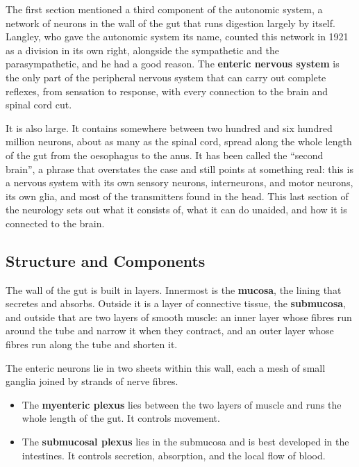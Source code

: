 \documentclass[11pt]{article}
\begin{document}
The first section mentioned a third component of the autonomic system, a network of neurons in the wall of the gut that runs digestion largely by itself. Langley, who gave the autonomic system its name, counted this network in 1921 as a division in its own right, alongside the sympathetic and the parasympathetic, and he had a good reason. The \textbf{enteric nervous system} is the only part of the peripheral nervous system that can carry out complete reflexes, from sensation to response, with every connection to the brain and spinal cord cut.

It is also large. It contains somewhere between two hundred and six hundred million neurons, about as many as the spinal cord, spread along the whole length of the gut from the oesophagus to the anus. It has been called the ``second brain'', a phrase that overstates the case and still points at something real: this is a nervous system with its own sensory neurons, interneurons, and motor neurons, its own glia, and most of the transmitters found in the head. This last section of the neurology sets out what it consists of, what it can do unaided, and how it is connected to the brain.

\subsection{Structure and Components}

The wall of the gut is built in layers. Innermost is the \textbf{mucosa}, the lining that secretes and absorbs. Outside it is a layer of connective tissue, the \textbf{submucosa}, and outside that are two layers of smooth muscle: an inner layer whose fibres run around the tube and narrow it when they contract, and an outer layer whose fibres run along the tube and shorten it.

The enteric neurons lie in two sheets within this wall, each a mesh of small ganglia joined by strands of nerve fibres.

\begin{itemize}
    \item The \textbf{myenteric plexus} lies between the two layers of muscle and runs the whole length of the gut. It controls movement.
    \item The \textbf{submucosal plexus} lies in the submucosa and is best developed in the intestines. It controls secretion, absorption, and the local flow of blood.
\end{itemize}
\end{document}
